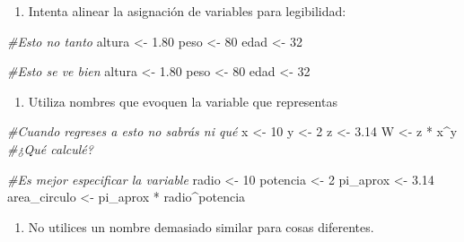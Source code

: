 \documentclass[
]{book}
\newenvironment{Shaded}{\begin{snugshade}}{\end{snugshade}}
\newcommand{\CommentTok}[1]{\textcolor[rgb]{0.56,0.35,0.01}{\textit{#1}}}
\newcommand{\DecValTok}[1]{\textcolor[rgb]{0.00,0.00,0.81}{#1}}
\newcommand{\FloatTok}[1]{\textcolor[rgb]{0.00,0.00,0.81}{#1}}
\newcommand{\NormalTok}[1]{#1}
\newcommand{\OtherTok}[1]{\textcolor[rgb]{0.56,0.35,0.01}{#1}}
\newcommand{\SpecialCharTok}[1]{\textcolor[rgb]{0.00,0.00,0.00}{#1}}
\providecommand{\tightlist}{%
  \setlength{\itemsep}{0pt}\setlength{\parskip}{0pt}}
\begin{document}
\begin{enumerate}
\def\labelenumi{\arabic{enumi}.}
\setcounter{enumi}{2}
\tightlist
\item
  Intenta alinear la asignación de variables para legibilidad:
\end{enumerate}

\begin{Shaded}
\begin{Highlighting}[]
\CommentTok{\#Esto no tanto}
\NormalTok{altura }\OtherTok{\textless{}{-}} \FloatTok{1.80}
\NormalTok{peso }\OtherTok{\textless{}{-}} \DecValTok{80}
\NormalTok{edad }\OtherTok{\textless{}{-}} \DecValTok{32}

\CommentTok{\#Esto se ve bien}
\NormalTok{altura }\OtherTok{\textless{}{-}} \FloatTok{1.80}
\NormalTok{peso   }\OtherTok{\textless{}{-}} \DecValTok{80}
\NormalTok{edad   }\OtherTok{\textless{}{-}} \DecValTok{32}
\end{Highlighting}
\end{Shaded}

\begin{enumerate}
\def\labelenumi{\arabic{enumi}.}
\setcounter{enumi}{3}
\tightlist
\item
  Utiliza nombres que evoquen la variable que representas
\end{enumerate}

\begin{Shaded}
\begin{Highlighting}[]
\CommentTok{\#Cuando regreses a esto no sabrás ni qué}
\NormalTok{x }\OtherTok{\textless{}{-}} \DecValTok{10}
\NormalTok{y }\OtherTok{\textless{}{-}} \DecValTok{2}
\NormalTok{z }\OtherTok{\textless{}{-}} \FloatTok{3.14}
\NormalTok{W }\OtherTok{\textless{}{-}}\NormalTok{ z }\SpecialCharTok{*}\NormalTok{ x}\SpecialCharTok{\^{}}\NormalTok{y }\CommentTok{\#¿Qué calculé?}

\CommentTok{\#Es mejor especificar la variable}
\NormalTok{radio        }\OtherTok{\textless{}{-}} \DecValTok{10}
\NormalTok{potencia     }\OtherTok{\textless{}{-}} \DecValTok{2}
\NormalTok{pi\_aprox     }\OtherTok{\textless{}{-}} \FloatTok{3.14}
\NormalTok{area\_circulo }\OtherTok{\textless{}{-}}\NormalTok{ pi\_aprox }\SpecialCharTok{*}\NormalTok{ radio}\SpecialCharTok{\^{}}\NormalTok{potencia}
\end{Highlighting}
\end{Shaded}

\begin{enumerate}
\def\labelenumi{\arabic{enumi}.}
\setcounter{enumi}{4}
\tightlist
\item
  No utilices un nombre demasiado similar para cosas diferentes.
\end{enumerate}
\end{document}
